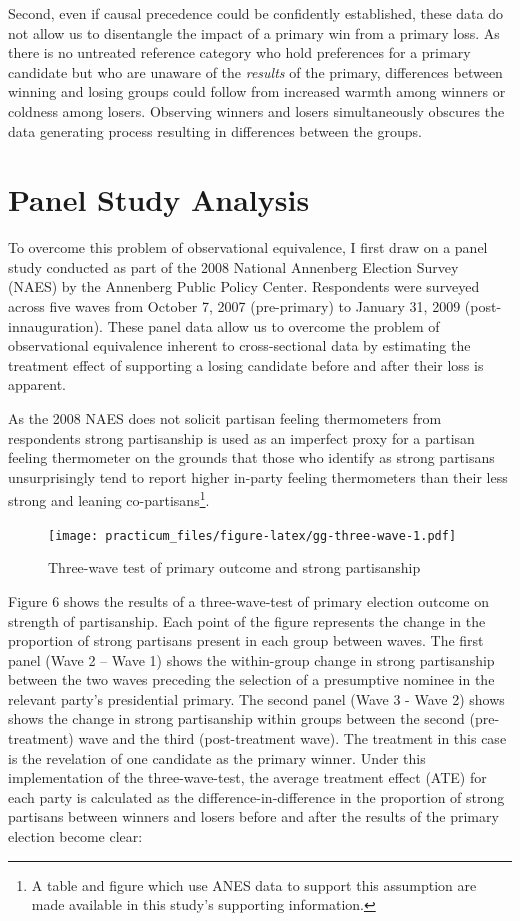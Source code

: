 \documentclass[
]{article}
\begin{document}
Second, even if causal precedence could be confidently established, these data do not allow us to disentangle the impact of a primary win from a primary loss. As there is no untreated reference category who hold preferences for a primary candidate but who are unaware of the \emph{results} of the primary, differences between winning and losing groups could follow from increased warmth among winners or coldness among losers. Observing winners and losers simultaneously obscures the data generating process resulting in differences between the groups.

\hypertarget{panel-study-analysis}{%
\section{Panel Study Analysis}\label{panel-study-analysis}}

To overcome this problem of observational equivalence, I first draw on a panel study conducted as part of the 2008 National Annenberg Election Survey (NAES) by the Annenberg Public Policy Center. Respondents were surveyed across five waves from October 7, 2007 (pre-primary) to January 31, 2009 (post-innauguration). These panel data allow us to overcome the problem of observational equivalence inherent to cross-sectional data by estimating the treatment effect of supporting a losing candidate before and after their loss is apparent.

As the 2008 NAES does not solicit partisan feeling thermometers from respondents strong partisanship is used as an imperfect proxy for a partisan feeling thermometer on the grounds that those who identify as strong partisans unsurprisingly tend to report higher in-party feeling thermometers than their less strong and leaning co-partisans\footnote{A table and figure which use ANES data to support this assumption are made available in this study's supporting information.}.

\begin{figure}
\centering
\texttt{[image: practicum\_files/figure-latex/gg-three-wave-1.pdf]}
\caption{\label{fig:gg-three-wave}Three-wave test of primary outcome and strong partisanship}
\end{figure}

Figure 6 shows the results of a three-wave-test of primary election outcome on strength of partisanship. Each point of the figure represents the change in the proportion of strong partisans present in each group between waves. The first panel (Wave 2 -- Wave 1) shows the within-group change in strong partisanship between the two waves preceding the selection of a presumptive nominee in the relevant party's presidential primary. The second panel (Wave 3 - Wave 2) shows shows the change in strong partisanship within groups between the second (pre-treatment) wave and the third (post-treatment wave). The treatment in this case is the revelation of one candidate as the primary winner. Under this implementation of the three-wave-test, the average treatment effect (ATE) for each party is calculated as the difference-in-difference in the proportion of strong partisans between winners and losers before and after the results of the primary election become clear:
\end{document}
